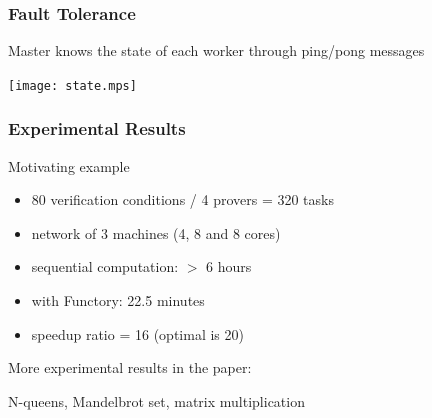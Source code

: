 \documentclass[xcolor=dvipsnames]{beamer}
\let\emph\alert
\begin{document}


\begin{frame}\frametitle {Fault Tolerance}

Master knows the state of each worker through ping/pong messages

  \begin{center}
    \texttt{[image: state.mps]}
  \end{center}

  
\end{frame}



\begin{frame}\frametitle {Experimental Results}
  Motivating example
  \begin{itemize}
  \item 80 verification conditions / 4 provers = 320 tasks
  \item network of 3 machines (4, 8 and 8 cores)
  \end{itemize}

  \begin{itemize}
  \item sequential computation: \emph{$>$ 6 hours}
  \item with Functory: \emph{22.5 minutes}
  \item speedup ratio = \emph{16} (optimal is 20)
  \end{itemize}


\bigskip
  More experimental results in the paper: \par N-queens, Mandelbrot set,
  matrix multiplication
\end{frame}

\end{document}
